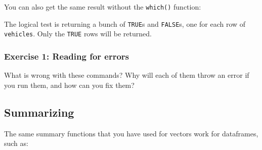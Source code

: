 \documentclass[
]{book}
\newenvironment{Shaded}{\begin{snugshade}}{\end{snugshade}}
\newcommand{\CommentTok}[1]{\textcolor[rgb]{0.56,0.35,0.01}{\textit{#1}}}
\newcommand{\DecValTok}[1]{\textcolor[rgb]{0.00,0.00,0.81}{#1}}
\newcommand{\NormalTok}[1]{#1}
\newcommand{\SpecialCharTok}[1]{\textcolor[rgb]{0.00,0.00,0.00}{#1}}
\begin{document}
You can also get the same result without the \texttt{which()} function:

\begin{Shaded}
\end{Shaded}

The logical test is returning a bunch of \texttt{TRUE}s and \texttt{FALSE}s, one for each row of \texttt{vehicles}. Only the \texttt{TRUE} rows will be returned.

\hypertarget{exercise-1-reading-for-errors}{%
\subsubsection*{Exercise 1: Reading for errors}\label{exercise-1-reading-for-errors}}

What is wrong with these commands? Why will each of them throw an error if you run them, and how can you fix them?

\begin{Shaded}
\end{Shaded}

\hypertarget{summarizing}{%
\subsection*{Summarizing}\label{summarizing}}

The same summary functions that you have used for vectors work for dataframes, such as:
\end{document}
